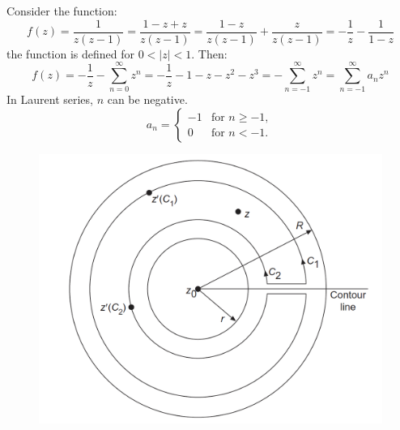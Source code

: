 \documentclass{article}
\begin{document}
\noindent
Consider the function:
\begin{equation}
    f(z) = \frac{1}{z(z-1)} = \frac{1 - z + z}{z(z-1)} 
= \frac{1 - z}{z(z - 1)} + \frac{z}{z(z - 1)} 
= -\frac{1}{z} - \frac{1}{1 - z}
\end{equation}
the function is defined for $0<|z|<1$. Then:
\begin{equation}
    f(z) = -\frac{1}{z} - \sum_{n=0}^{\infty} z^n 
= -\frac{1}{z} - 1 - z - z^2 - z^3 
= -\sum_{n=-1}^{\infty} z^n = \sum_{n=-1}^{\infty} a_n z^n
\end{equation}
In Laurent series, $n$ can be negative.
\begin{equation}
    a_n =
\begin{cases}
-1 & \text{for } n \geq -1, \\
0 & \text{for } n < -1.
\end{cases}
\end{equation}

\newpage

\begin{figure}[h]
    \centering
    \includegraphics[width=0.5\linewidth]{fig19.png}
\end{figure}
\end{document}
